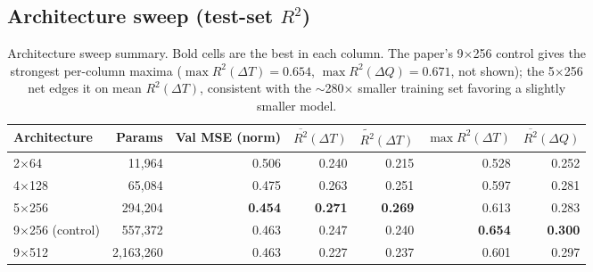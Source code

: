 \documentclass[11pt]{article}
\begin{document}
\subsection{Architecture sweep (test-set $R^2$)}

\begin{table}[h]
\centering
\small
\begin{tabular}{lrrrrrr}
\toprule
Architecture & Params & Val MSE (norm) & $\overline{R^2}(\Delta T)$ &
$\widetilde{R^2}(\Delta T)$ & $\max R^2(\Delta T)$ & $\overline{R^2}(\Delta Q)$ \\
\midrule
2$\times$64 & 11{,}964 & 0.506 & 0.240 & 0.215 & 0.528 & 0.252 \\
4$\times$128 & 65{,}084 & 0.475 & 0.263 & 0.251 & 0.597 & 0.281 \\
5$\times$256 & 294{,}204 & \textbf{0.454} & \textbf{0.271} & \textbf{0.269} & 0.613 & 0.283 \\
9$\times$256 (control) & 557{,}372 & 0.463 & 0.247 & 0.240 & \textbf{0.654} & \textbf{0.300} \\
9$\times$512 & 2{,}163{,}260 & 0.463 & 0.227 & 0.237 & 0.601 & 0.297 \\
\bottomrule
\end{tabular}
\caption{Architecture sweep summary. Bold cells are the best in each column.
The paper's 9$\times$256 control gives the strongest per-column maxima
($\max R^2(\Delta T)=0.654$, $\max R^2(\Delta Q)=0.671$, not shown); the
5$\times$256 net edges it on mean $R^2(\Delta T)$, consistent with the
$\sim$280$\times$ smaller training set favoring a slightly smaller model.}
\end{table}
\end{document}
